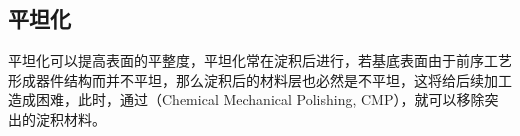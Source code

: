 \subsection{平坦化}
平坦化可以提高表面的平整度，平坦化常在淀积后进行，若基底表面由于前序工艺形成器件结构而并不平坦，那么淀积后的材料层也必然是不平坦，这将给后续加工造成困难，此时，通过（Chemical Mechanical Polishing, CMP），就可以移除突出的淀积材料。



